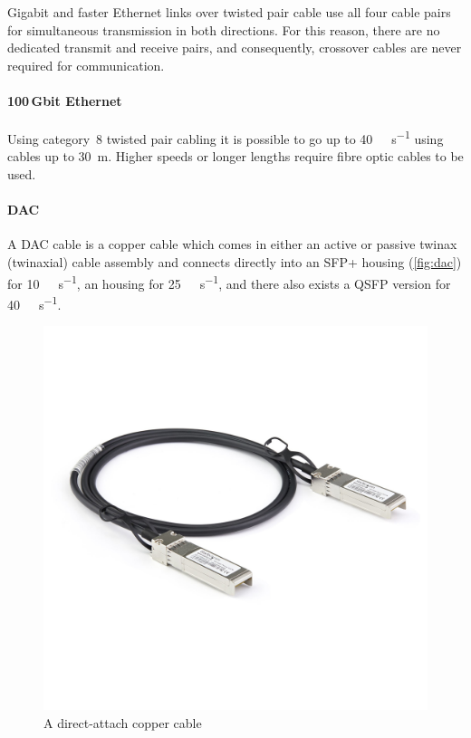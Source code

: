 Gigabit and faster Ethernet links over twisted pair cable use all four cable pairs for simultaneous transmission in both directions.
For this reason, there are no dedicated transmit and receive pairs, and consequently, crossover cables are never required for  communication.

\paragraph{100\,Gbit Ethernet}
Using category~8 twisted pair cabling it is possible to go up to \SI{40}{\giga\bit\per\second} using cables up to \SI{30}{\metre}.
Higher speeds or longer lengths require fibre optic cables to be used.

\paragraph{\acl{DAC}}
A \acf{DAC} cable is a copper cable which comes in either an active or passive twinax (twinaxial) cable assembly and connects directly into an
\acs{SFP+} housing (\vref{fig:dac}) for \SI{10}{\giga\bit\per\second},
an  housing for \SI{25}{\giga\bit\per\second},
and there also exists a \acs{QSFP} version for \SI{40}{\giga\bit\per\second}.

\begin{figure}
\centering
\includegraphics[width=\textwidth]{images/physical/dac-cable.jpeg}
\caption{A direct-attach copper cable}
\label{fig:dac}
\end{figure}


